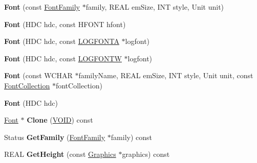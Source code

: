 \begin{DoxyCompactItemize}
\item 
\mbox{\label{class_font_affc2753d1d0ae23b0d73595826e3c549}} 
{\bfseries Font} (const \hyperlink{class_font_family}{Font\+Family} $\ast$family, R\+E\+AL em\+Size, I\+NT style, Unit unit)
\item 
\mbox{\label{class_font_a122f64202c04433ce3e9f019fd5bdb85}} 
{\bfseries Font} (H\+DC hdc, const H\+F\+O\+NT hfont)
\item 
\mbox{\label{class_font_a850e65c8767cee5578d04fbbd59021f0}} 
{\bfseries Font} (H\+DC hdc, const \hyperlink{struct_l_o_g_f_o_n_t_a}{L\+O\+G\+F\+O\+N\+TA} $\ast$logfont)
\item 
\mbox{\label{class_font_a3d6e40277da82bd6092cdb3f756dcae8}} 
{\bfseries Font} (H\+DC hdc, const \hyperlink{struct_l_o_g_f_o_n_t_w}{L\+O\+G\+F\+O\+N\+TW} $\ast$logfont)
\item 
\mbox{\label{class_font_acc379969d07f46ad28930fa40803914a}} 
{\bfseries Font} (const W\+C\+H\+AR $\ast$family\+Name, R\+E\+AL em\+Size, I\+NT style, Unit unit, const \hyperlink{class_font_collection}{Font\+Collection} $\ast$font\+Collection)
\item 
\mbox{\label{class_font_a4df0c2931b0e50f9d5de6aaee33bc58a}} 
{\bfseries Font} (H\+DC hdc)
\item 
\mbox{\label{class_font_a19ba617bb8c0df6cb24bc5a281ad1dbb}} 
\hyperlink{class_font}{Font} $\ast$ {\bfseries Clone} (\hyperlink{interfacevoid}{V\+O\+ID}) const
\item 
\mbox{\label{class_font_ac362abe48874eb585b4b17f0604be75d}} 
Status {\bfseries Get\+Family} (\hyperlink{class_font_family}{Font\+Family} $\ast$family) const
\item 
\mbox{\label{class_font_afb26fbba4114316b0a460ff7bc0b8f1e}} 
R\+E\+AL {\bfseries Get\+Height} (const \hyperlink{class_graphics}{Graphics} $\ast$graphics) const
\item 
\mbox{\label{class_font_aaf88c4e62385213df40abbdbaf16f1be}} 

\end{DoxyCompactItemize}
